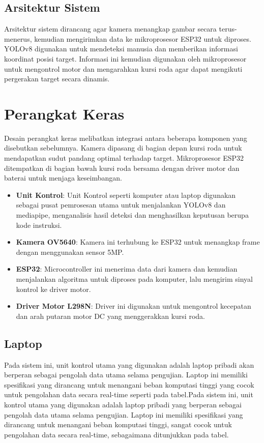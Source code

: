 \subsection{Arsitektur Sistem}
\label{subsec:arsitektursistem}

Arsitektur sistem dirancang agar kamera menangkap gambar secara terus-menerus, kemudian mengirimkan data ke mikroprosesor ESP32 untuk diproses. YOLOv8 digunakan untuk mendeteksi manusia dan memberikan informasi koordinat posisi target. Informasi ini kemudian digunakan oleh mikroprosesor untuk mengontrol motor dan mengarahkan kursi roda agar dapat mengikuti pergerakan target secara dinamis.

\section{Perangkat Keras}
\label{sec:perangkathardware}

Desain perangkat keras melibatkan integrasi antara beberapa komponen yang disebutkan sebelumnya. Kamera dipasang di bagian depan kursi roda untuk mendapatkan sudut pandang optimal terhadap target. Mikroprosesor ESP32 ditempatkan di bagian bawah kursi roda bersama dengan driver motor dan baterai untuk menjaga keseimbangan.

\begin{itemize}[nolistsep]
    \item \textbf{Unit Kontrol}: Unit Kontrol seperti komputer atau laptop digunakan sebagai pusat pemrosesan utama untuk menjalankan YOLOv8 dan mediapipe, menganalisis hasil deteksi dan menghasilkan keputusan berupa kode instruksi.
    \item \textbf{Kamera OV5640}: Kamera ini terhubung ke ESP32 untuk menangkap frame dengan menggunakan sensor 5MP.
    \item \textbf{ESP32}: Microcontroller ini menerima data dari kamera dan kemudian menjalankan algoritma untuk diproses pada komputer, lalu mengirim sinyal kontrol ke driver motor.
    \item \textbf{Driver Motor L298N}: Driver ini digunakan untuk mengontrol kecepatan dan arah putaran motor DC yang menggerakkan kursi roda.
\end{itemize}

\subsection{Laptop}
\label{subsec:laptop}
Pada sistem ini, unit kontrol utama yang digunakan adalah laptop pribadi akan berperan sebagai pengolah data utama selama pengujian. Laptop ini memiliki spesifikasi yang dirancang untuk menangani beban komputasi tinggi yang cocok untuk pengolahan data secara real-time seperti pada tabel.Pada sistem ini, unit kontrol utama yang digunakan adalah laptop pribadi yang berperan sebagai pengolah data utama selama pengujian. Laptop ini memiliki spesifikasi yang dirancang untuk menangani beban komputasi tinggi, sangat cocok untuk pengolahan data secara real-time, sebagaimana ditunjukkan pada tabel.

